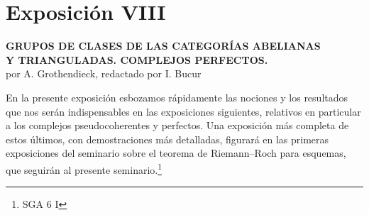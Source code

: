 \newpage
\section*{Exposición VIII}

\begin{center}
\textbf{GRUPOS DE CLASES DE LAS CATEGORÍAS ABELIANAS}\\
\textbf{Y TRIANGULADAS. COMPLEJOS PERFECTOS.}\\[1ex]
por A. Grothendieck, redactado por I. Bucur
\end{center}

En la presente exposición esbozamos rápidamente las nociones y los resultados que nos serán indispensables en las exposiciones siguientes, relativos en particular a los complejos pseudocoherentes y perfectos. Una exposición más completa de estos últimos, con demostraciones más detalladas, figurará en las primeras exposiciones del seminario sobre el teorema de Riemann--Roch para esquemas, que seguirán al presente seminario.\footnote{SGA 6 I}
